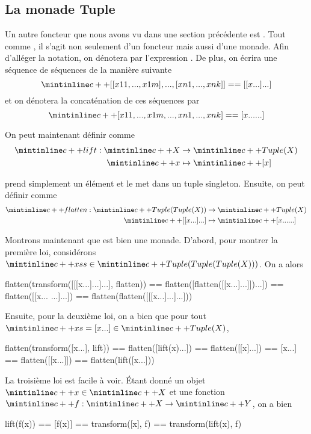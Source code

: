 \subsection{La monade Tuple}
Un autre foncteur que nous avons vu dans une section précédente est .
Tout comme , il s'agit non seulement d'un foncteur mais aussi d'une
monade. Afin d'alléger la notation, on dénotera par \cc{[x1, ..., xn]}
l'expression . De plus, on écrira une séquence
de séquences de la manière suivante
\[
    \cc{[[x11, ..., x1m], ..., [xn1, ..., xnk]] == [[x...]...]}
\]
et on dénotera la concaténation de ces séquences par
\[
    \cc{[x11, ..., x1m, ..., xn1, ..., xnk] == [x... ...]}
\]

On peut maintenant définir  comme
\begin{align*}
    \cc{lift} : \cc{X} &\to \cc{Tuple(X)} \\
                \cc{x} &\mapsto \cc{[x]}
\end{align*}

 prend simplement un élément et le met dans un tuple singleton.
Ensuite, on peut définir  comme
\begin{align*}
    \cc{flatten} : \cc{Tuple(Tuple(X))} &\to \cc{Tuple(X)} \\
                   \cc{[[x...]...]} &\mapsto \cc{[x... ...]}
\end{align*}

Montrons maintenant que  est bien une monade. D'abord, pour montrer
la première loi, considérons $\cc{xss} \in \cc{Tuple(Tuple(Tuple(X)))}$.
On a alors
\begin{cpp}
    flatten(transform([[[x...]...]...], flatten))
        == flatten([flatten([[x...]...]])...])
        == flatten([[x... ...]...])
        == flatten(flatten([[[x...]...]...]))
\end{cpp}

Ensuite, pour la deuxième loi, on a bien que pour tout
$\cc{xs = [x...]} \in \cc{Tuple(X)}$,
\begin{cpp}
    flatten(transform([x...], lift)) == flatten([lift(x)...])
                                     == flatten([[x]...])
                                     == [x...]
                                     == flatten([[x...]])
                                     == flatten(lift([x...]))
\end{cpp}

La troisième loi est facile à voir. Étant donné un objet $\cc{x} \in \cc{X}$
et une fonction $\cc{f} : \cc{X} \to \cc{Y}$, on a bien
\begin{cpp}
    lift(f(x)) == [f(x)]
               == transform([x], f)
               == transform(lift(x), f)
\end{cpp}


